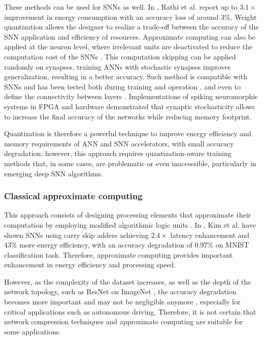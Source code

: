 These methods can be used for SNNs as well. In \cite{rathi2018stdp}, Rathi et al. report up to $3.1\times$ improvement in energy consumption with an accuracy loss of around $3\%$. Weight quantization allows the designer to realize a trade-off between the accuracy of the SNN application and efficiency of resources. Approximate computing can also be applied at the neuron level, where irrelevant units are deactivated to reduce the computation cost of the SNNs \cite{sen2017approximate}. This computation skipping can be applied randomly on synapses, training ANNs with stochastic synapses improves generalization, resulting in a better accuracy\cite{srivastava2014dropout, wan2013regularization}. Such method is compatible with SNNs and has been tested both during training \cite{neftci2016stochastic, srinivasan2016magnetic} and operation \cite{buesing2011neural}, and even to define the connectivity between layers \cite{bellec2017deep, chen20184096}. Implementations of spiking neuromorphic systems in FPGA \cite{sheik2016synaptic} and hardware \cite{jerry2017ultra} demonstrated that synaptic stochasticity allows to increase the final accuracy of the networks while reducing memory footprint.

Quantization is therefore a powerful technique to improve energy efficiency and memory requirements of ANN and SNN accelerators, with small accuracy degradation; however, this approach requires quantization-aware training methods that, in some cases, are problematic or even inaccessible, particularly in emerging deep SNN algorithms\cite{zhang2018survey}.

\subsubsection{Classical approximate computing}
This approach consists of designing processing elements that approximate their computation by employing modified algorithmic logic units \cite{han2013approximate}. In \cite{kim2013energy}, Kim et al. have shown SNNs using carry skip adders achieving $2.4\times$ latency enhancement and $43\%$ more energy efficiency, with an accuracy degradation of 0.97\% on MNIST classification task. Therefore, approximate computing provides important enhancement in energy efficiency and processing speed.

However, as the complexity of the dataset increases, as well as the depth of the network topology, such as ResNet \cite{he2016deep} on ImageNet \cite{russakovsky2015imagenet}, the accuracy degradation becomes more important and may not be negligible anymore \cite{rastegari2016xnor}, especially for critical applications such as autonomous driving. Therefore, it is not certain that network compression techniques and approximate computing are suitable for some applications.

